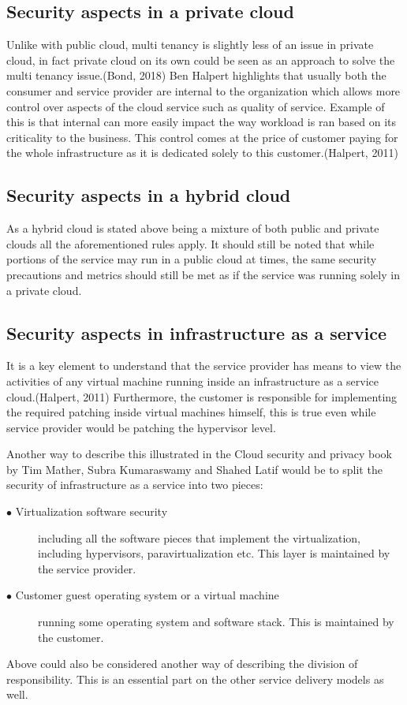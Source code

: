 \documentclass{article}
\begin{document}
\subsection{Security aspects in a private cloud}
Unlike with public cloud, multi tenancy is slightly less of an issue in private cloud, in fact private cloud on its own could be seen as an approach to solve the multi tenancy issue.(Bond, 2018)
Ben Halpert highlights that usually both the consumer and service provider are internal to the organization which allows more control over aspects of the cloud service such as quality of service.
Example of this is that internal can more easily impact the way workload is ran based on its criticality to the business. This control comes at the price of customer paying for the whole infrastructure as it is dedicated solely to this customer.(Halpert, 2011) 
\subsection{Security aspects in a hybrid cloud}
As a hybrid cloud is stated above being a mixture of both public and private clouds all the aforementioned rules apply. It should still be noted that while portions of the service may run in a public cloud at times, the same security precautions and metrics should still be met as if the service was running solely in a private cloud.
\subsection{Security aspects in infrastructure as a service}
It is a key element to understand that the service provider has means to view the activities of any virtual machine running inside an infrastructure as a service cloud.(Halpert, 2011)
Furthermore, the customer is responsible for implementing the required patching inside virtual machines himself, this is true even while service provider would be patching the hypervisor level.
\par
Another way to describe this illustrated in the Cloud security and privacy book by Tim Mather, Subra Kumaraswamy and Shahed Latif would be to split the security of infrastructure as a service into two pieces:
\begin{description}
	\item[$\bullet$ Virtualization software security] including all the software pieces that implement the virtualization, including hypervisors, paravirtualization etc. This layer is maintained by the service provider.
	\item[$\bullet$ Customer guest operating system or a virtual machine] running some operating system and software stack. This is maintained by the customer.
\end{description}
Above could also be considered another way of describing the division of responsibility. This is an essential part on the other service delivery models as well.
\end{document}
